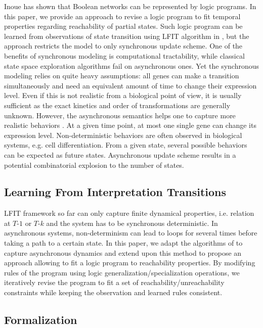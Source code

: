 Inoue \cite{inoue2011logic} has shown that Boolean networks can be represented by logic programs.
In this paper, we provide an approach to revise a logic program to fit temporal properties regarding reachability of partial states.
%
Such logic program can be learned from observations of state transition using LFIT algorithm in \cite{ribeiro2015learning}, but the approach restricts the model to only synchronous update scheme.
One of the benefits of synchronous modeling is computational tractability, while classical state space exploration algorithms fail on asynchronous ones.
Yet the synchronous modeling relies on quite heavy assumptions:
all genes can make a transition simultaneously and need an equivalent amount of time to change their expression level.
Even if this is not realistic from a biological point of view, it is usually sufficient as the exact kinetics and order of transformations are generally unknown.
However, the asynchronous semantics helps one to capture more realistic behaviors \cite{bernot2009}.
At a given time point, at most one single gene can change its expression level.
Non-deterministic behaviors are often observed in biological systems, e.g. cell differentiation.
From a given state, several possible behaviors can be expected as future states.
Asynchronous update scheme results in a potential combinatorial explosion to the number of states.


\subsection{Learning From Interpretation Transitions}\label{sec:lfit}
LFIT framework so far can only capture finite dynamical properties, i.e. relation at $T$-$1$ or $T$-$k$ and the system has to be synchronous deterministic.
In asynchronous systems, non-determinism can lead to loops for several times before taking a path to a certain state.
In this paper, we adapt the algorithms of \cite{ribeiro2015learning,DMTRICLP15} to capture asynchronous dynamics and extend upon this method to propose an approach allowing to fit a logic program to reachability properties.
By modifying rules of the program using logic generalization/specialization operations, we iteratively revise the program to fit a set of reachability/unreachability constraints while keeping the observation and learned rules consistent.

\subsection{Formalization}
    
